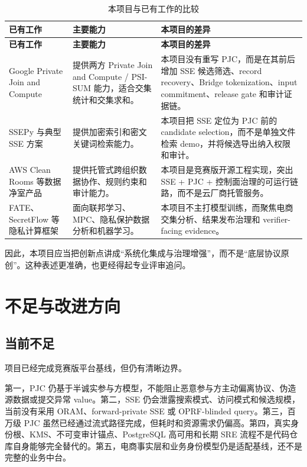 \documentclass[UTF8,a4paper,12pt,oneside]{ctexrep}
\begin{document}
\begin{longtable}{p{}p{}p{}}
\caption{本项目与已有工作的比较}\\
\toprule
\textbf{已有工作} & \textbf{主要能力} & \textbf{本项目的差异} \\
\midrule
\endfirsthead
\toprule
\textbf{已有工作} & \textbf{主要能力} & \textbf{本项目的差异} \\
\midrule
\endhead
\bottomrule
\endfoot
Google Private Join and Compute & 提供两方 Private Join and Compute / PSI-SUM 能力，适合交集统计和交集求和。 & 本项目没有重写 PJC，而是在其前后增加 SSE 候选筛选、record recovery、Bridge tokenization、input commitment、release gate 和审计证据链。 \\
SSEPy 与典型 SSE 方案 & 提供加密索引和密文关键词检索能力。 & 本项目把 SSE 定位为 PJC 前的 candidate selection，而不是单独文件检索 demo，并将候选导出纳入权限和审计。 \\
AWS Clean Rooms 等数据净室产品 & 提供托管式跨组织数据协作、规则约束和审计能力。 & 本项目是竞赛版开源工程实现，突出 SSE + PJC + 控制面治理的可运行链路，而不是云厂商托管服务。 \\
FATE、SecretFlow 等隐私计算框架 & 面向联邦学习、MPC、隐私保护数据分析和机器学习。 & 本项目不主打模型训练，而聚焦电商交集分析、结果发布治理和 verifier-facing evidence。 \\
\end{longtable}

因此，本项目应当把创新点讲成“系统化集成与治理增强”，而不是“底层协议原创”。这种表述更准确，也更经得起专业评审追问。

\chapter{不足与改进方向}

\section{当前不足}

项目已经完成竞赛版平台基线，但仍有清晰边界。

第一，PJC 仍基于半诚实参与方模型，不能阻止恶意参与方主动偏离协议、伪造源数据或提交异常 value。第二，SSE 仍会泄露搜索模式、访问模式和候选规模，当前没有采用 ORAM、forward-private SSE 或 OPRF-blinded query。第三，百万级 PJC 虽然已经通过流式路径完成，但耗时和资源需求仍偏高。第四，真实身份根、KMS、不可变审计锚点、PostgreSQL 高可用和长期 SRE 流程不是代码仓库自身能够完全替代的。第五，电商事实层和业务身份模型仍是适配基线，还不是完整的业务中台。
\end{document}
